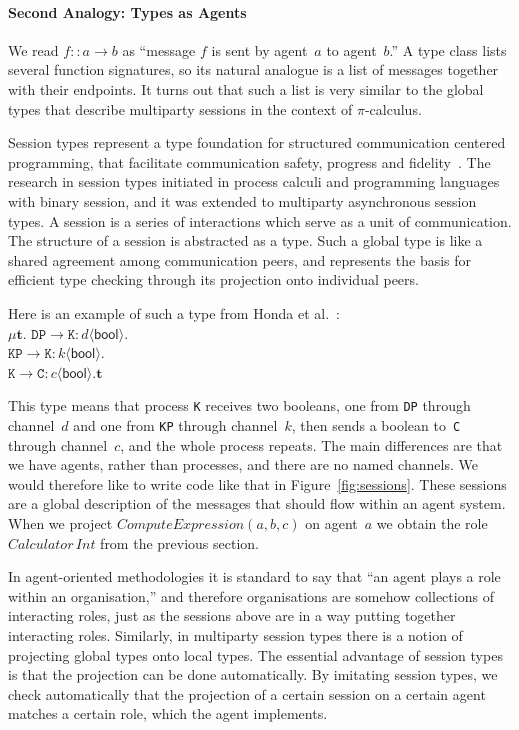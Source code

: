 \documentclass[a4paper,12pt,oneside,fleqn]{book} %
\begin{document}
{{\def\l#1->#2:#3<#4>{\mathtt{#1}\to\mathtt{#2}:#3\langle\mathsf{#4}\rangle}
\paragraph{Second Analogy: Types as Agents} We read $f::a\to b$ as
``message $f$ is sent by agent~$a$ to agent~$b$.'' A type class lists
several function signatures, so its natural analogue is a list of messages
together with their endpoints. It turns out that such a list is very
similar to the global types that describe multiparty sessions in the
context of $\pi$-calculus.

Session types represent a type foundation for structured communication
centered programming, that facilitate communication safety, progress and
fidelity~\cite{dblp:conf/popl/hondayc08}. The research in session types
initiated in process calculi and programming languages with binary session,
and it was extended to multiparty asynchronous session types. A session is
a series of interactions which serve as a unit of communication. The
structure of a session is abstracted as a type. Such a global type is like
a shared agreement among communication peers, and represents the basis for
efficient type checking through its projection onto individual peers.



Here is an example of such a type from
Honda et al.~\cite{dblp:conf/popl/hondayc08}:\\
$\mu\mathbf{t}.$
  $\l DP->K:d<bool>. $\\
  $\l KP->K:k<bool>. $\\
  $\l K->C:c<bool>.\mathbf{t}$

This type means that process \texttt{K} receives two booleans, one from
\texttt{DP} through channel~$d$ and one from \texttt{KP} through channel~$k$,
then sends a boolean to~\texttt{C} through channel~$c$, and the whole process
repeats. The main differences are that we have agents, rather than processes,
and there are no named channels. We would therefore like to write code like
that in Figure~\ref{fig:sessions}.  These sessions are a global description of
the messages that should flow within an agent system. When we project
$\mathit{ComputeExpression}(a,b,c)$ on agent~$a$ we obtain the role
$\mathit{Calculator}\,\mathit{Int}$ from the previous section.}

In agent-oriented methodologies it is standard to say that ``an agent plays
a role within an organisation,'' and therefore organisations are somehow
collections of interacting roles, just as the sessions above are in a way
putting together interacting roles. Similarly, in multiparty session types
there is a notion of projecting global types onto local types. The
essential advantage of session types is that the projection can be done
automatically. By imitating session types, we check automatically that the
projection of a certain session on a certain agent matches a certain role,
which the agent implements.

}
\end{document}

